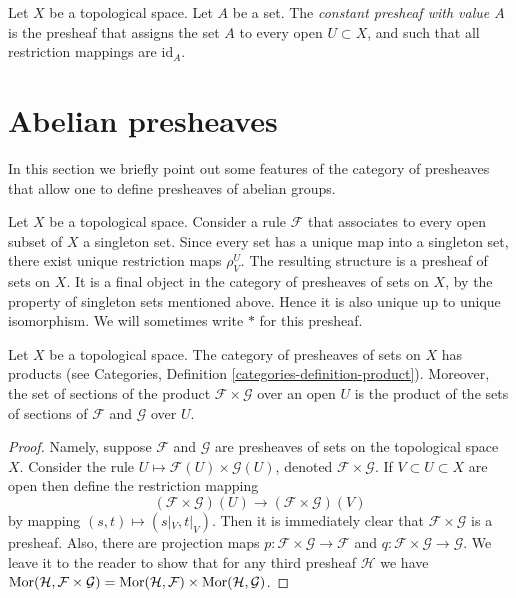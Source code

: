 \begin{definition}
\label{definition-constant-presheaf}
Let $X$ be a topological space. Let $A$ be a set.
The {\it constant presheaf with value $A$} is the
presheaf that assigns the set $A$ to every open
$U \subset X$, and such that all restriction mappings
are $\text{id}_A$.
\end{definition}

\section{Abelian presheaves}
\label{section-abelian-presheaves}

\noindent
In this section we briefly point out some features of the
category of presheaves that allow one to define presheaves
of abelian groups.

\begin{example}
\label{example-singleton-presheaf}
Let $X$ be a topological space. Consider a rule $\mathcal{F}$ that
associates to every open subset of $X$ a singleton set. Since every set
has a unique map into a singleton set, there exist unique restriction
maps $\rho^U_V$. The resulting structure is a presheaf of sets on $X$.
It is a final object in the category of presheaves of sets on $X$, by the
property of singleton sets mentioned above. Hence it is
also unique up to unique isomorphism. We will sometimes write $*$
for this presheaf.
\end{example}

\begin{lemma}
\label{lemma-product-presheaves}
Let $X$ be a topological space. The category of presheaves of sets
on $X$ has products (see
Categories, Definition \ref{categories-definition-product}).
Moreover, the set of
sections of the product $\mathcal{F} \times \mathcal{G}$
over an open $U$ is the product of the sets of sections of
$\mathcal{F}$ and $\mathcal{G}$ over $U$.
\end{lemma}

\begin{proof}
Namely, suppose $\mathcal{F}$ and $\mathcal{G}$ are
presheaves of sets on the topological space $X$.
Consider the rule $U \mapsto \mathcal{F}(U) \times \mathcal{G}(U)$,
denoted $\mathcal{F} \times \mathcal{G}$. If $V \subset U \subset X$
are open then define the restriction mapping
$$
(\mathcal{F} \times \mathcal{G})(U)
\longrightarrow
(\mathcal{F} \times \mathcal{G})(V)
$$
by mapping $(s, t) \mapsto (s|_V, t|_V)$. Then it is immediately
clear that $\mathcal{F} \times \mathcal{G}$ is a presheaf.
Also, there are projection maps
$p : \mathcal{F} \times \mathcal{G} \to \mathcal{F}$
and
$q : \mathcal{F} \times \mathcal{G} \to \mathcal{G}$.
We leave it to the reader to show that
for any third presheaf $\mathcal{H}$ we have
$\mathop{\mathrm{Mor}}\nolimits(\mathcal{H}, \mathcal{F} \times \mathcal{G})
= \mathop{\mathrm{Mor}}\nolimits(\mathcal{H}, \mathcal{F}) \times
\mathop{\mathrm{Mor}}\nolimits(\mathcal{H}, \mathcal{G})$.
\end{proof}


